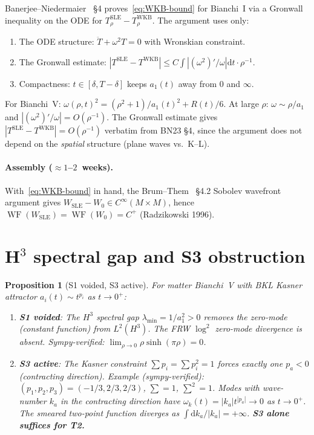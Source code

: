 \documentclass[11pt]{article}
\newtheorem{proposition}[theorem]{Proposition}
\theoremstyle{definition}
\DeclareMathOperator{\WF}{WF}
\begin{document}
Banerjee--Niedermaier~\cite{BN23} \S4 proves~\eqref{eq:WKB-bound} for Bianchi~I
via a Gronwall inequality on the ODE for $T^{\mathrm{SLE}}_\rho - T^{\mathrm{WKB}}_\rho$.
The argument uses only:
\begin{enumerate}
\item The ODE structure: $\ddot{T} + \omega^2 T = 0$ with Wronskian constraint.
\item The Gronwall estimate: $|T^{\mathrm{SLE}} - T^{\mathrm{WKB}}| \le
  C \int |(\omega^2)' / \omega| \mathrm{d}t \cdot \rho^{-1}$.
\item Compactness: $t \in [\delta, T-\delta]$ keeps $a_1(t)$ away from $0$ and $\infty$.
\end{enumerate}
For Bianchi~V: $\omega(\rho,t)^2 = (\rho^2+1)/a_1(t)^2 + R(t)/6$.
At large $\rho$: $\omega \sim \rho/a_1$ and $|(\omega^2)'/\omega| = O(\rho^{-1})$.
The Gronwall estimate gives $|T^{\mathrm{SLE}} - T^{\mathrm{WKB}}| = O(\rho^{-1})$
verbatim from BN23 \S4, since the argument does not depend on the \emph{spatial}
structure (plane waves vs.\ K--L).

\paragraph{Assembly ($\approx 1$--$2$~weeks).}

With~\eqref{eq:WKB-bound} in hand, the Brum--Them~\cite{BrumThem2013} \S4.2
Sobolev wavefront argument gives $W_{\mathrm{SLE}} - W_0 \in C^\infty(M\times M)$,
hence $\WF(W_{\mathrm{SLE}}) = \WF(W_0) = C^+$ (Radzikowski 1996).

\section{H\texorpdfstring{$^3$}{3} spectral gap and S3 obstruction}\label{sec:obstructions}

\begin{proposition}[S1 voided, S3 active]
For matter Bianchi~V with BKL Kasner attractor $a_i(t) \sim t^{p_i}$ as $t\to 0^+$:
\begin{enumerate}
\item \textbf{S1 voided}: The $H^3$ spectral gap $\lambda_{\min} = 1/a_1^2 > 0$
  removes the zero-mode (constant function) from $L^2(H^3)$.
  The FRW $\log^2$ zero-mode divergence is absent. Sympy-verified: $\lim_{\rho\to 0}\rho\sinh(\pi\rho) = 0$.
\item \textbf{S3 active}: The Kasner constraint $\sum p_i = \sum p_i^2 = 1$
  forces exactly one $p_a < 0$ (contracting direction).
  Example (sympy-verified): $(p_1, p_2, p_3) = (-1/3, 2/3, 2/3)$,
  $\sum = 1$, $\sum^2 = 1$.
  Modes with wave-number $k_a$ in the contracting direction have
  $\omega_k(t) = |k_a|t^{|p_a|} \to 0$ as $t \to 0^+$.
  The smeared two-point function diverges as $\int \mathrm{d}k_a/|k_a| = +\infty$.
  \textbf{S3 alone suffices for T2.}
\end{enumerate}
\end{proposition}
\end{document}

